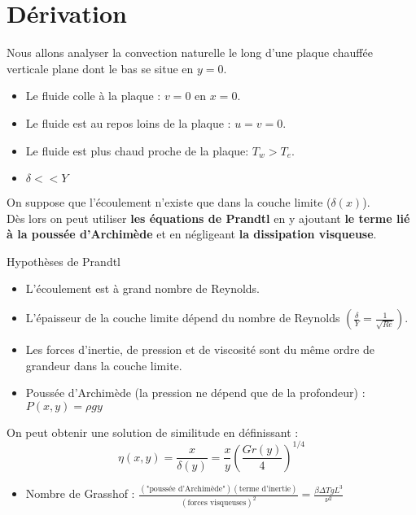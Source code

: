 \section{Dérivation}

\noindent Nous allons analyser la convection naturelle le long d'une plaque chauffée verticale plane dont le bas se situe en $y=0$.

\begin{itemize}
  \item Le fluide colle à la plaque : $v = 0$ en $x = 0$.
  \item Le fluide est au repos loins de la plaque : $u = v = 0$.
  \item Le fluide est plus chaud proche de la plaque: $T_w > T_e$.
  \item $\delta << Y$
\end{itemize}

\noindent On suppose que l'écoulement n'existe que dans la couche limite ($\delta(x)$). \\ 
Dès lors on peut utiliser \textbf{les équations de Prandtl} en y ajoutant \textbf{le terme lié à la poussée d'Archimède} et en négligeant \textbf{la dissipation visqueuse}.

\noindent Hypothèses de Prandtl

\begin{itemize}
  \item L'écoulement est à grand nombre de Reynolds.
  \item L'épaisseur de la couche limite dépend du nombre de Reynolds $(\frac{\delta}{Y} = \frac{1}{\sqrt{Re}})$.
  \item Les forces d'inertie, de pression et de viscosité sont du même ordre de grandeur dans la couche limite.
\end{itemize}

\begin{itemize}
  \item Poussée d'Archimède (la pression ne dépend que de la profondeur) : $P(x, y) = \rho g y$
\end{itemize}

\noindent On peut obtenir une solution de similitude en définissant :
\begin{equation}
  \eta(x,y) = \frac{x}{\delta(y)} = \frac{x}{y} \left( \frac{Gr(y)}{4} \right)^{1/4}
\end{equation}

\begin{itemize}
  \item Nombre de Grasshof : $\frac{(\text{"poussée d'Archimède"})(\text{terme d'inertie})}{(\text{forces visqueuses})^2} = \frac{\beta \Delta T g L^3}{\nu^2}$
\end{itemize}

